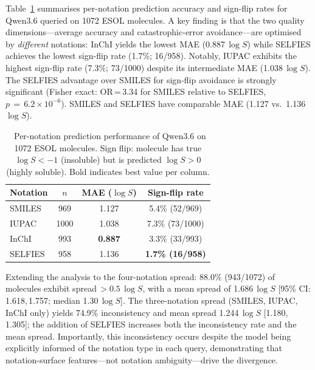 \documentclass[twoside,twocolumn,9pt]{article}
\newcommand{\logS}{\ensuremath{\log S}}
\begin{document}
Table~\ref{tbl:notation} summarises per-notation prediction accuracy and sign-flip rates for Qwen3.6 queried on 1072 ESOL molecules. A key finding is that the two quality dimensions---average accuracy and catastrophic-error avoidance---are optimised by \textit{different} notations: InChI yields the lowest MAE (0.887\,$\logS$) while SELFIES achieves the lowest sign-flip rate (1.7\%; 16/958). Notably, IUPAC exhibits the highest sign-flip rate (7.3\%; 73/1000) despite its intermediate MAE (1.038\,$\logS$). The SELFIES advantage over SMILES for sign-flip avoidance is strongly significant (Fisher exact: OR\,=\,3.34 for SMILES relative to SELFIES, $p\,=\,6.2\!\times\!10^{-6}$). SMILES and SELFIES have comparable MAE (1.127 vs.\ 1.136\,$\logS$).

\begin{table}[h]
\small
\caption{\ Per-notation prediction performance of Qwen3.6 on 1072 ESOL molecules. Sign flip: molecule has true $\logS < -1$ (insoluble) but is predicted $\logS > 0$ (highly soluble). Bold indicates best value per column.}
\label{tbl:notation}
\begin{tabular*}{0.48\textwidth}{@{\extracolsep{\fill}}lccc}
\hline
Notation & $n$ & MAE ($\logS$) & Sign-flip rate \\
\hline
SMILES  & 969  & 1.127 & 5.4\% (52/969) \\
IUPAC   & 1000 & 1.038 & 7.3\% (73/1000) \\
InChI   & 993  & \textbf{0.887} & 3.3\% (33/993) \\
SELFIES & 958  & 1.136 & \textbf{1.7\% (16/958)} \\
\hline
\end{tabular*}
\end{table}

Extending the analysis to the four-notation spread: 88.0\% (943/1072) of molecules exhibit spread\,$>0.5$\,$\logS$, with a mean spread of 1.686\,$\logS$ [95\% CI: 1.618,\,1.757; median 1.30\,$\logS$]. The three-notation spread (SMILES, IUPAC, InChI only) yields 74.9\% inconsistency and mean spread 1.244\,$\logS$ [1.180,\,1.305]; the addition of SELFIES increases both the inconsistency rate and the mean spread. Importantly, this inconsistency occurs despite the model being explicitly informed of the notation type in each query, demonstrating that notation-surface features---not notation ambiguity---drive the divergence.
\end{document}
